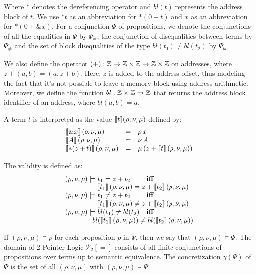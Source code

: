 Where $*$ denotes the dereferencing operator and $bl(t)$ represents the address block of $t$.
We use $*t$ as an abbreviation for $*(0+t)$ and $x$ as an abbreviation for $*(0+\&x)$.
For a conjunction $\Psi$ of propositions, we denote the conjunctions of all the equalities in $\Psi$ by $\Psi_{=}$, the conjunction of disequalities between terms by $\Psi_{\neq}$ and the set of block disequalities of the type $bl(t_1) \neq bl(t_2)$ by $\Psi_{bl}$.


We also define the operator $(+) : \mathbb{Z} \rightarrow \mathbb{Z} \times \mathbb{Z} \rightarrow \mathbb{Z} \times \mathbb{Z}$ on addresses, where $z + (a,b) = (a, z+b)$.
Here, $z$ is added to the address offset, thus modeling the fact that it's not possible to leave a memory block using address arithmetic.
Moreover, we define the function $bl : \mathbb{Z} \times \mathbb{Z} \rightarrow \mathbb{Z}$ that returns the address block identifier of an address, where $bl(a,b) = a$.

A term $t$ is interpreted as the value $\llbracket t\rrbracket(\rho, \nu, \mu)$ defined by:
\[
  \begin{array}{lll}
    \llbracket\& x\rrbracket\,(\rho,\nu,\mu)   & = & \rho\,x                          \\
    \llbracket A\rrbracket\,(\rho,\nu,\mu)      & = & \nu\,A                           \\
    \llbracket*(z+t)\rrbracket\,(\rho,\nu,\mu) & = & \mu\,(z+\llbracket t\rrbracket\,(\rho,\nu,\mu)) \\
  \end{array}
\]

The validity is defined as:
\[
  \begin{array}{ll}
    (\rho,\nu,\mu)\models t_1 = z+t_2          & \textbf{iff}
    \\ \multicolumn{2}{c}{\quad\quad\quad\quad\sem{t_1}\,(\rho,\nu,\mu) = z+\sem{t_2}\,(\rho,\nu,\mu)}	\\
    (\rho,\nu,\mu)\models t_1 \neq z+t_2       & \textbf{iff}
    \\ \multicolumn{2}{c}{\quad\quad\quad\quad\sem{t_1}\,(\rho,\nu,\mu) \neq z+\sem{t_2}\,(\rho,\nu,\mu)}	\\
    (\rho,\nu,\mu)\models bl(t_1) \neq bl(t_2) & \textbf{iff}
    \\ \multicolumn{2}{c}{\quad\quad\quad\quad bl(\sem{t_1}\,(\rho, \nu, \mu)) \neq bl(\sem{t_2}\,(\rho, \nu, \mu))}
  \end{array}
\]

If $(\rho, \nu, \mu)\models p$ for each proposition $p$ in $\Psi$, then we say that $(\rho, \nu, \mu) \models \Psi$.
The domain of 2-Pointer Logic $\mathcal{P}_2[=]$ consists of all finite conjunctions
of propositions over terms up to semantic equivalence.
The concretization $\gamma(\Psi)$ of $\Psi$ is the set of all $(\rho, \nu, \mu)$ with $(\rho, \nu, \mu) \models \Psi$.


